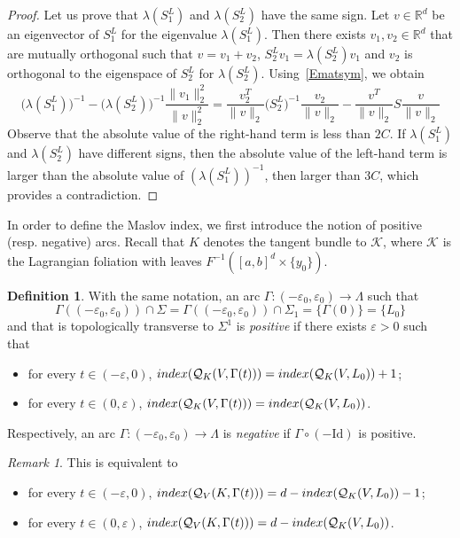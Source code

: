 \documentclass[10pt,a4paper]{amsart}
\numberwithin{equation}{section}
\newcommand*\cq{\mathcal{Q}}
\newcommand*\cal{\mathcal}
\newcommand{\rId}{\mathrm{Id}}
\newcommand*\R{\mathbb{R}}
\theoremstyle{definition}
\newtheorem{defi}[theo]{Definition}
\theoremstyle{remark}
\newtheorem{rema}[theo]{Remark}
\begin{document}
\begin{proof}
Let us prove that $\lambda(S_1^L)$ and $\lambda(S_2^L)$ have the same sign. Let $v\in\R^d$ be an eigenvector of $S_1^L$ for the eigenvalue $\lambda(S_1^L)$. Then there exists $v_1, v_2\in\R^d$ that are mutually orthogonal such that {$v=v_1+v_2$,} $S_2^Lv_1=\lambda(S_2^L)v_1$ and $v_2$ is orthogonal to the eigenspace of $S_2^L$ for $\lambda(S_2^L)$. Using~\eqref{Ematsym}, we obtain
\[
\big(\lambda\left(S_1^L\right)\big)^{-1}-\big(\lambda\left(S_2^L\right)\big)^{-1}\frac{\| v_1\|_2^2}{\| v\|_2^2}=\frac{v_2^T}{\| v\|_2} \big(S_2^L\big)^{-1}\frac{v_2}{\| v\|_2}- \frac{v^T}{\| v\|_2}S\frac{v}{\| v\|_2}
\]
Observe that the absolute value of the right-hand term is less than $2C$. If $\lambda(S_1^L)$ and $\lambda(S_2^L)$ have different signs, then the absolute value of the left-hand term is larger than the absolute value of $(\lambda(S_1^L))^{-1}$, then larger than $3C$, which provides a contradiction.
\end{proof}

In order to define the Maslov index, we first introduce the notion of positive (resp. negative) arcs. Recall that $K$ denotes the tangent bundle to $\cal K$, where $\cal K$ is the Lagrangian foliation with leaves $F^{-1}([a,b]^d\times\{y_0\})$.

\begin{defi}
With the same notation, an arc $\Gamma:(-\varepsilon_0, \varepsilon_0)\rightarrow \Lambda$ such that
\[
\Gamma((-\varepsilon_0,\varepsilon_0))\cap \Sigma=\Gamma((-\varepsilon_0,\varepsilon_0))\cap \Sigma_1=\{ \Gamma(0)\} =\{L_0\}
\]
and that is topologically transverse to $\Sigma^1$ is {\sl positive} if there exists $\varepsilon>0$ such that
\begin{itemize}
\item for every $t\in (-\varepsilon, 0)$, ${\rm index}(\cq_{K}(V, \Gamma(t)))={\rm index}(\cq_{K}(V, L_0))+1$;
\item for every $t\in (0, \varepsilon)$, ${\rm index}(\cq_{K}(V, \Gamma(t)))={\rm index}(\cq_{K}(V, L_0))$.
\end{itemize}
Respectively, an arc $\Gamma:(-\varepsilon_0,\varepsilon_0)\to\Lambda$ is {\sl negative} if $\Gamma\circ(-\rId)$ is positive.
\end{defi}

\begin{rema}
This is equivalent to
\begin{itemize}
\item for every $t\in (-\varepsilon, 0)$, ${\rm index}(\cq_{V}(K, \Gamma(t)))=d-{\rm index}(\cq_{K}(V, L_0))-1$;
\item for every $t\in (0, \varepsilon)$, ${\rm index}(\cq_{V}(K, \Gamma(t)))=d-{\rm index}(\cq_{K}(V, L_0))$.
\end{itemize}
\end{rema}
\end{document}
